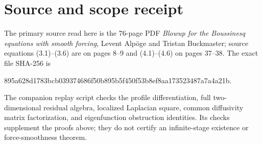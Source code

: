 \section*{Source and scope receipt}
The primary source read here is the 76-page PDF
\emph{Blowup for the Boussinesq equations with smooth forcing},
Levent Alp\"oge and Tristan Buckmaster; source equations (3.1)--(3.6)
are on pages 8--9 and (4.1)--(4.6) on pages 37--38.
The exact file SHA-256 is
\begin{center}\small\ttfamily
895a628d1783bcb039374686f50b895b5f450f53b8ef8aa173523487a7a4a21b.
\end{center}
The companion replay script checks the profile differentiation, full
two-dimensional residual algebra, localized Laplacian square, common
diffusivity matrix factorization, and eigenfunction obstruction
identities. Its checks supplement the proofs above; they do not certify
an infinite-stage existence or force-smoothness theorem.
